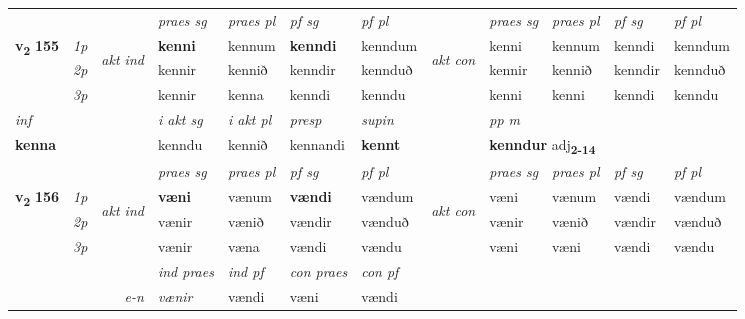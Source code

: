 \begin{longtable}[l]{X>{\footnotesize\itshape}llXXXXlXXXX}
 & &   & \textit{praes sg}  & \textit{praes pl}    & \textit{ pf sg} & \textit{pf pl} & & \textit{praes sg}  & \textit{praes pl}    & \textit{pf sg} & \textit{pf pl }  \\ \cmidrule{4-7} \cmidrule{9-12}
 \multirow{2}{*}{{{\textbf{v{\textsubscript{2}}} \Large{\textbf{155}}}}}  & 1p & \multirow{3}{*}{\begin{turn}{90}\textit{akt ind}\end{turn}} & \textbf{kenni} & kennum & \textbf{kenndi} & kenndum & \multirow{3}{*}{\begin{turn}{90}\textit{akt con}\end{turn}} &kenni & kennum & kenndi & kenndum\\*
 & 2p &  &  kennir  & kennið & kenndir & kennduð & & kennir & kennið & kenndir & kennduð \\*
 & 3p &  & kennir & kenna & kenndi & kenndu & & kenni & kenni& kenndi & kenndu \\*
\cmidrule{4-7} \cmidrule{9-12}

   {\textit{inf}} & &  & \textit{i akt sg} & \textit{i akt pl}   & \textit{presp} & \textit{supin}  && \textit{pp m} \\*
  {\textbf{kenna}} & && kenndu  & kennið   & kennandi &  \textbf{kennt}  && \multicolumn{2}{l}{\textbf{kenndur} adj\textbf{\textsubscript{2-14}}} \\*

\midrule

 & &   & \textit{praes sg}  & \textit{praes pl}    & \textit{ pf sg} & \textit{pf pl} & & \textit{praes sg}  & \textit{praes pl}    & \textit{pf sg} & \textit{pf pl }  \\ \cmidrule{4-7} \cmidrule{9-12}
 \multirow{2}{*}{{{\textbf{v{\textsubscript{2}}} \Large{\textbf{156}}}}}  & 1p & \multirow{3}{*}{\begin{turn}{90}\textit{akt ind}\end{turn}} & \textbf{væni} & vænum & \textbf{vændi} & vændum & \multirow{3}{*}{\begin{turn}{90}\textit{akt con}\end{turn}} &væni & vænum & vændi & vændum\\*
 & 2p &  &  vænir  & vænið & vændir & vænduð & & vænir & vænið & vændir & vænduð \\*
 & 3p &  & vænir & væna & vændi & vændu & & væni & væni& vændi & vændu \\*
\cmidrule{4-7} \cmidrule{9-12}

   && &  \textit{ind praes} & \textit{ind pf} & \textit{con praes} & \textit{con pf} \\*
\multicolumn{3}{r}{\textit{e-n}} & vænir & vændi & væni & vændi \\*


\end{longtable}

